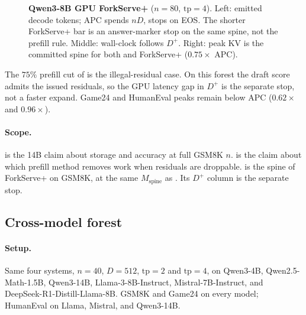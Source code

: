 \begin{figure}[t]
\centering
\resizebox{\textwidth}{!}{}
\caption{\textbf{Qwen3-8B GPU ForkServe+} ($n{=}80$, $\mathrm{tp}{=}4$).
Left: emitted decode tokens; APC spends $nD$, \sys stops on EOS.
The shorter ForkServe+ bar is an answer-marker stop on the same spine, not the prefill rule.
Middle: wall-clock follows $D^{+}$.
Right: peak KV is the committed spine for both \sys and ForkServe+ ($0.75\times$ APC).}
\label{fig:eval-plus}
\end{figure}

The $75\%$ prefill cut of  is the illegal-residual case.
On this forest the draft score admits the issued residuals, so the GPU latency gap in $D^{+}$ is the separate stop, not a faster expand.
Game24 and HumanEval peaks remain below APC ($0.62\times$ and $0.96\times$).

\paragraph{Scope.}
 is the 14B claim about storage and accuracy at full GSM8K $n$.
 is the claim about which prefill method removes work when residuals are droppable.
 is the spine of ForkServe+ on GSM8K, at the same $M_{\mathrm{spine}}$ as \sys.
Its $D^{+}$ column is the separate stop.

\subsection{Cross-model forest}
\label{sec:eval-multi}

\paragraph{Setup.}
Same four systems, $n{=}40$, $D{=}512$, $\mathrm{tp}{=}2$ and $\mathrm{tp}{=}4$, on Qwen3-4B, Qwen2.5-Math-1.5B, Qwen3-14B, Llama-3-8B-Instruct, Mistral-7B-Instruct, and DeepSeek-R1-Distill-Llama-8B.
GSM8K and Game24 on every model; HumanEval on Llama, Mistral, and Qwen3-14B.


